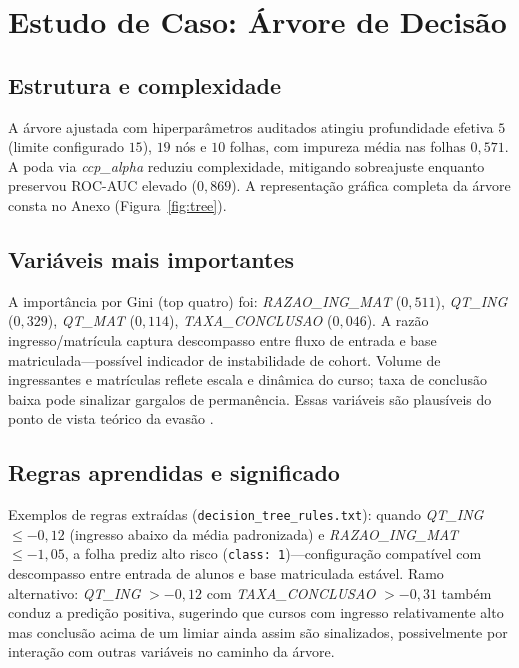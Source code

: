 \documentclass[conference]{IEEEtran}
\begin{document}
\section{Estudo de Caso: Árvore de Decisão}
\label{sec:arvore}

\subsection{Estrutura e complexidade}
A árvore ajustada com hiperparâmetros auditados atingiu profundidade efetiva $5$ (limite configurado $15$), $19$ nós e $10$ folhas, com impureza média nas folhas $0{,}571$. A poda via \textit{ccp\_alpha} reduziu complexidade, mitigando sobreajuste enquanto preservou ROC-AUC elevado ($0{,}869$). A representação gráfica completa da árvore consta no Anexo (Figura~\ref{fig:tree}).

\subsection{Variáveis mais importantes}
A importância por Gini (top quatro) foi: \textit{RAZAO\_ING\_MAT} ($0{,}511$), \textit{QT\_ING} ($0{,}329$), \textit{QT\_MAT} ($0{,}114$), \textit{TAXA\_CONCLUSAO} ($0{,}046$). A razão ingresso/matrícula captura descompasso entre fluxo de entrada e base matriculada---possível indicador de instabilidade de cohort. Volume de ingressantes e matrículas reflete escala e dinâmica do curso; taxa de conclusão baixa pode sinalizar gargalos de permanência. Essas variáveis são plausíveis do ponto de vista teórico da evasão \cite{tinto2010}.

\subsection{Regras aprendidas e significado}
Exemplos de regras extraídas (\texttt{decision\_tree\_rules.txt}): quando \textit{QT\_ING} $\leq -0{,}12$ (ingresso abaixo da média padronizada) e \textit{RAZAO\_ING\_MAT} $\leq -1{,}05$, a folha prediz alto risco (\texttt{class: 1})---configuração compatível com descompasso entre entrada de alunos e base matriculada estável. Ramo alternativo: \textit{QT\_ING} $> -0{,}12$ com \textit{TAXA\_CONCLUSAO} $> -0{,}31$ também conduz a predição positiva, sugerindo que cursos com ingresso relativamente alto mas conclusão acima de um limiar ainda assim são sinalizados, possivelmente por interação com outras variáveis no caminho da árvore.
\end{document}
